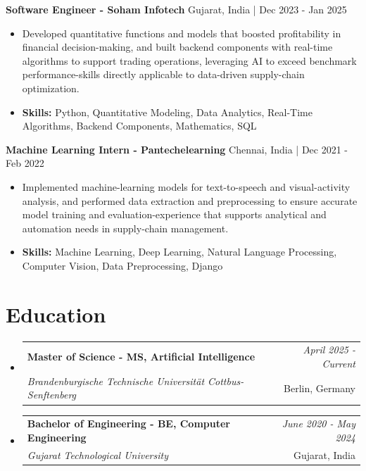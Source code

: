 \documentclass[a4paper,11pt]{article}
\makeatletter
\newcommand{\resumeSubheading}[4]{
\vspace{0.5mm}\item
    \begin{tabular*}{\linewidth}[t]{l@{\extracolsep{\fill}}r}
        \textbf{#1} & \textit{\footnotesize{#4}} \\
        \textit{\footnotesize{#3}} &  \footnotesize{#2}\\
    \end{tabular*}
    \vspace{-2.4mm}
}
\makeatother
\begin{document}
\vspace{1mm}
  \textbf{Software Engineer - Soham Infotech} \hfill Gujarat, India | Dec 2023 - Jan 2025
\vspace{-1.5mm} %
\begin{itemize}
  \item Developed quantitative functions and models that boosted profitability in financial decision-making, and built backend components with real-time algorithms to support trading operations, leveraging AI to exceed benchmark performance-skills directly applicable to data-driven supply-chain optimization.

\vspace{-2mm}
  \item \textbf{Skills:} Python, Quantitative Modeling, Data Analytics, Real-Time Algorithms, Backend Components, Mathematics, SQL
\end{itemize}

\vspace{1mm}
  \textbf{Machine Learning Intern - Pantechelearning} \hfill Chennai, India | Dec 2021 - Feb 2022
\vspace{-1.5mm} %
\begin{itemize}
  \item Implemented machine-learning models for text-to-speech and visual-activity analysis, and performed data extraction and preprocessing to ensure accurate model training and evaluation-experience that supports analytical and automation needs in supply-chain management.
\vspace{-2mm}
  \item \textbf{Skills:} Machine Learning, Deep Learning, Natural Language Processing, Computer Vision, Data Preprocessing, Django
\end{itemize}\section{\textbf{Education}}
\vspace{-0.4mm}

\begin{itemize}[leftmargin=0.15in, label={}]
\resumeSubheading
{Master of Science - MS, Artificial Intelligence }{Berlin, Germany}
{Brandenburgische Technische Universität Cottbus-Senftenberg  }{April 2025 - Current}

\vspace{1.0mm} %
\resumeSubheading
{Bachelor of Engineering - BE, Computer Engineering  }{Gujarat, India}
{Gujarat Technological University }{June 2020 - May 2024}

\end{itemize}
\end{document}
